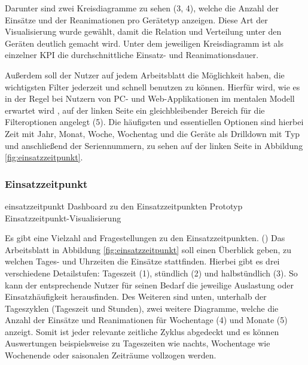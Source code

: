 
Darunter sind zwei Kreisdiagramme zu sehen (3, 4), welche die Anzahl der Einsätze und der Reanimationen pro Gerätetyp anzeigen.
Diese Art der Visualisierung wurde gewählt, damit die Relation und Verteilung unter den Geräten deutlich gemacht wird.
Unter dem jeweiligen Kreisdiagramm ist als einzelner \gls{KPI} die durchschnittliche Einsatz- und Reanimationsdauer.


\label{par:filter}
Außerdem soll der Nutzer auf jedem Arbeitsblatt die Möglichkeit haben, die wichtigsten Filter jederzeit und schnell benutzen zu können.
Hierfür wird, wie es in der Regel bei Nutzern von PC- und Web-Applikationen im mentalen Modell erwartet wird \cite{Grunwied.2017}, auf der linken Seite ein gleichbleibender Bereich für die Filteroptionen angelegt (5).
Die häufigsten und essentiellen Optionen sind hierbei Zeit mit Jahr, Monat, Woche, Wochentag und die Geräte als \gls{Drilldown} mit Typ und anschließend der Seriennummern, zu sehen auf der linken Seite in Abbildung \ref{fig:einsatzzeitpunkt}.

\subsubsection{Einsatzzeitpunkt}
\label{subsub:zeitpunkt}
\bildbreit
{einsatzzeitpunkt}
{Dashboard zu den Einsatzzeitpunkten}
{Prototyp Einsatzzeitpunkt-Visualisierung}

Es gibt eine Vielzahl and Fragestellungen zu den Einsatzzeitpunkten. ()
Das Arbeitsblatt in Abbildung \ref{fig:einsatzzeitpunkt} soll einen Überblick geben, zu welchen Tages- und Uhrzeiten die Einsätze stattfinden.
Hierbei gibt es drei verschiedene Detailstufen: Tageszeit (1), stündlich (2) und halbstündlich (3). 
So kann der entsprechende Nutzer für seinen Bedarf die jeweilige Auslastung oder Einsatzhäufigkeit herausfinden.
Des Weiteren sind unten, unterhalb der Tageszyklen (Tageszeit und Stunden), zwei weitere Diagramme, welche die Anzahl der Einsätze und Reanimationen für Wochentage (4) und Monate (5) anzeigt. 
Somit ist jeder relevante zeitliche Zyklus abgedeckt und es können Auswertungen beispielsweise zu Tageszeiten wie nachts, Wochentage wie Wochenende oder saisonalen Zeiträume vollzogen werden.

